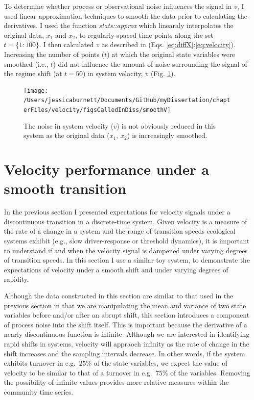 \documentclass[12pt,twoside,openany]{reedthesis}
\begin{document}
To determine whether process or observational noise influences the signal in \(v\), I used linear approximation techniques to smooth the data prior to calculating the derivatives. I used the function \emph{stats::approx} which linearaly interpolates the original data, \(x_1\) and \(x_2\), to regularly-spaced time points along the set \(t=\{1:100\}\). I then calculated \(v\) as described in (Eqs. \eqref{eq:diffX}:\eqref{eq:velocity}). Increasing the number of points (\(t\)) at which the original state variables were smoothed (i.e., \(t\)) did not influence the amount of noise surrounding the signal of the regime shift (at \(t=50\)) in system velocity, \(v\) (Fig. \ref{fig:smoothV}).
\begin{figure}
\texttt{[image: /Users/jessicaburnett/Documents/GitHub/myDissertation/chapterFiles/velocity/figsCalledInDiss/smoothV]} \caption{The noise in system velocity ($v$) is not obviously reduced in this system as the original data ($x_1$, $x_2$) is increasingly smoothed.}\label{fig:smoothV}
\end{figure}
\hypertarget{velocity-performance-under-a-smooth-transition}{%
\section{Velocity performance under a smooth transition}\label{velocity-performance-under-a-smooth-transition}}

In the previous section I presented expectations for velocity signals under a discontinuous transition in a discrete-time system. Given velocity is a measure of the rate of a change in a system and the range of transition speeds ecological systems exhibit (e.g., slow driver-response or threshold dynamics), it is important to understand if and when the velocity signal is dampened under varying degrees of transition speeds. In this section I use a similar toy system, to demonstrate the expectations of velocity under a smooth shift and under varying degrees of rapidity.

Although the data constructed in this section are similar to that used in the previous section in that we are manipulating the mean and variance of two state variables before and/or after an abrupt shift, this section introduces a component of process noise into the shift itself. This is important because the derivative of a nearly discontinuous function is infinite. Although we are interested in identifying rapid shifts in systems, velocity will appraoch infinity as the rate of change in the shift increases and the sampling intervals decrease. In other words, if the system exhibits turnover in e.g.~\(25\%\) of the state variables, we expect the value of velocity to be similar to that of a turnover in e.g.~\(75\%\) of the variables. Removing the possibility of infinite values provides more relative measures within the community time series.
\end{document}
